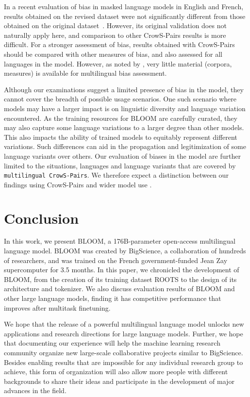 In a recent evaluation of bias in masked language models in English and French, results obtained on the revised dataset were not significantly different from those obtained on the original dataset~\cite{neveol-etal-2022-french}. However, its original validation does not naturally apply here, and comparison to other CrowS-Pairs results is more difficult. For a stronger assessment of bias, results obtained with CrowS-Pairs should be compared with other measures of bias, and also assessed for all languages in the model. However, as noted by \cite{talat2022you}, very little material (corpora, measures) is available for multilingual bias assessment. 

Although our examinations suggest a limited presence of bias in the model, they cannot cover the breadth of possible usage scenarios. One such scenario where models may have a larger impact is on linguistic diversity and language variation encountered. As the training resources for BLOOM are carefully curated, they may also capture some language variations to a larger degree than other models. This also impacts the ability of trained models to equitably represent different variations. Such differences can aid in the propagation and legitimization of some language variants over others. Our evaluation of biases in the model are further limited to the situations, languages and language variants that are covered by \texttt{multilingual CrowS-Pairs}. We therefore expect a distinction between our findings using CrowS-Pairs and wider model use \citep[for a more detailed exploration on such differences, see][]{raji_AI_2021}.

\section{Conclusion}
In this work, we present BLOOM, a 176B-parameter open-access multilingual language model. BLOOM was created by BigScience, a collaboration of hundreds of researchers, and was trained on the French government-funded Jean Zay supercomputer for 3.5 months. In this paper, we chronicled the development of BLOOM, from the creation of its training dataset ROOTS to the design of its architecture and tokenizer. We also discuss evaluation results of BLOOM and other large language models, finding it has competitive performance that improves after multitask finetuning.

We hope that the release of a powerful multilingual language model unlocks new applications and research directions for large language models. Further, we hope that documenting our experience will help the machine learning research community organize new large-scale collaborative projects similar to BigScience. Besides enabling results that are impossible for any individual research group to achieve, this form of organization will also allow more people with different backgrounds to share their ideas and participate in the development of major advances in the field.


